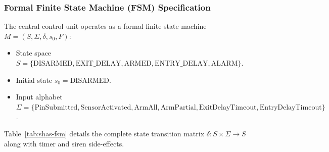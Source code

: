 \documentclass[11pt,a4paper]{article}
\begin{document}
\subsubsection{Formal Finite State Machine (FSM) Specification}

The central control unit operates as a formal finite state machine $M = (S, \Sigma, \delta, s_0, F)$:
\begin{itemize}[leftmargin=*]
    \item State space $S = \{\text{DISARMED}, \text{EXIT\_DELAY}, \text{ARMED}, \text{ENTRY\_DELAY}, \text{ALARM}\}$.
    \item Initial state $s_0 = \text{DISARMED}$.
    \item Input alphabet $\Sigma = \{\text{PinSubmitted}, \text{SensorActivated}, \text{ArmAll}, \text{ArmPartial}, \text{ExitDelayTimeout}, \text{EntryDelayTimeout}\}$.
\end{itemize}

Table~\ref{tab:shas-fsm} details the complete state transition matrix $\delta: S \times \Sigma \to S$ along with timer and siren side-effects.
\end{document}
